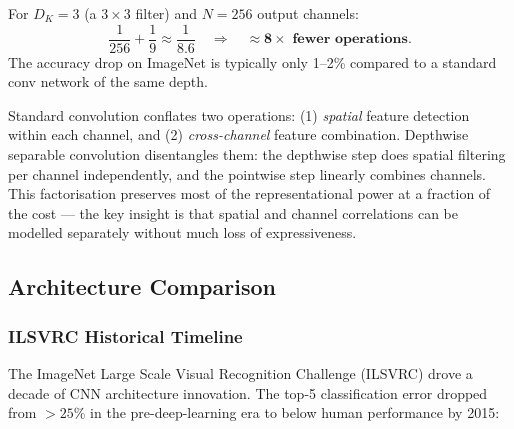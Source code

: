 \documentclass[11pt,a4paper]{article}
\begin{document}
For $D_K = 3$ (a $3\times3$ filter) and $N = 256$ output channels:
\[
  \frac{1}{256} + \frac{1}{9} \approx \frac{1}{8.6}
  \quad\Longrightarrow\quad \approx\mathbf{8\times\text{ fewer operations}}.
\]
The accuracy drop on ImageNet is typically only 1--2\% compared to a standard conv network of
the same depth.

\begin{insightbox}
Standard convolution conflates two operations: (1) \emph{spatial} feature detection within each
channel, and (2) \emph{cross-channel} feature combination.  Depthwise separable convolution
disentangles them: the depthwise step does spatial filtering per channel independently, and the
pointwise step linearly combines channels.  This factorisation preserves most of the
representational power at a fraction of the cost — the key insight is that spatial and channel
correlations can be modelled separately without much loss of expressiveness.
\end{insightbox}

\subsection{Architecture Comparison}
\label{sec:arch_comparison}

\subsubsection{ILSVRC Historical Timeline}

The ImageNet Large Scale Visual Recognition Challenge (ILSVRC) drove a decade of CNN architecture innovation. The top-5 classification error dropped from $>25\%$ in the pre-deep-learning era to below human performance by 2015:
\end{document}
